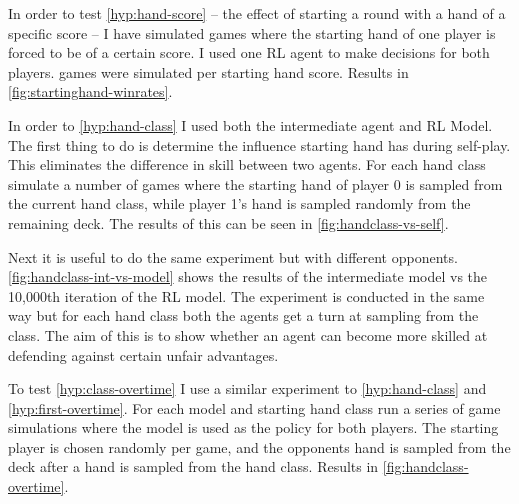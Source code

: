 \documentclass[../main.tex]{subfiles}
\begin{document}
In order to test \cref{hyp:hand-score} -- the effect of starting a round with a hand of a specific score -- I have simulated games where the starting hand of one player is forced to be of a certain score. I used one RL agent to make decisions for both players.  games were simulated per starting hand score. Results in \autoref{fig:startinghand-winrates}.

In order to \cref{hyp:hand-class} I used both the intermediate agent and RL Model. The first thing to do is determine the influence starting hand has during self-play. This eliminates the difference in skill between two agents. For each hand class simulate a number of games where the starting hand of player 0 is sampled from the current hand class, while player 1's hand is sampled randomly from the remaining deck. The results of this can be seen in \autoref{fig:handclass-vs-self}. 

Next it is useful to do the same experiment but with different opponents. \autoref{fig:handclass-int-vs-model} shows the results of the intermediate model vs the 10,000th iteration of the RL model. The experiment is conducted in the same way but for each hand class both the agents get a turn at sampling from the class. The aim of this is to show whether an agent can become more skilled at defending against certain unfair advantages. 


To test \cref{hyp:class-overtime} I use a similar experiment to \cref{hyp:hand-class} and \cref{hyp:first-overtime}. For each model and starting hand class run a series of game simulations where the model is used as the policy for both players. The starting player is chosen randomly per game, and the opponents hand is sampled from the deck after a hand is sampled from the hand class. Results in \autoref{fig:handclass-overtime}.
\end{document}
